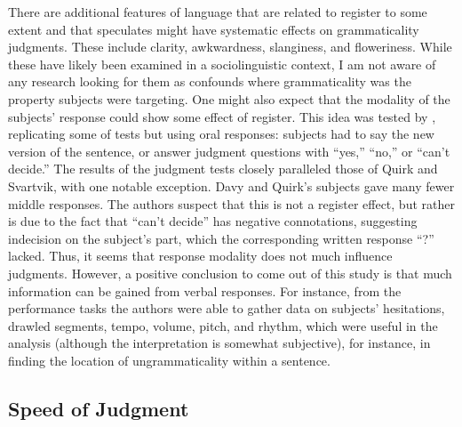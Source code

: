 There are additional features of language that are related to register to some extent and that \citet{Ross1979} speculates might have systematic effects on grammaticality judgments. These include clarity, awkwardness, slanginess, and floweriness. While these have likely been examined in a sociolinguistic context, I am not aware of any research looking for them as confounds where grammaticality was the property subjects were targeting. One might also expect that the modality of the subjects' response could show some effect of register. This idea was tested by \citet{DavyEtAl1969}, replicating some of  tests but using oral responses: subjects had to say the new version of the sentence, or answer judgment questions with ``yes,'' ``no,'' or ``can't decide.'' The results of the judgment tests closely paralleled those of Quirk and Svartvik, with one notable exception. Davy and Quirk's subjects gave many fewer middle responses. The authors suspect that this is not a register effect, but rather is due to the fact that ``can't decide'' has negative connotations, suggesting indecision on the subject's part, which the corresponding written response ``?'' lacked. Thus, it seems that response modality does not much influence judgments. However, a positive conclusion to come out of this study is that much information can be gained from verbal
responses. For instance, from the performance tasks the authors were able to gather data on subjects' hesitations, drawled segments, tempo, volume, pitch, and rhythm, which were useful in the analysis (although the interpretation is somewhat subjective), for instance, in finding the location of ungrammaticality within a sentence.
 
\subsection{Speed of Judgment} \label{sec:5.2.7} 

